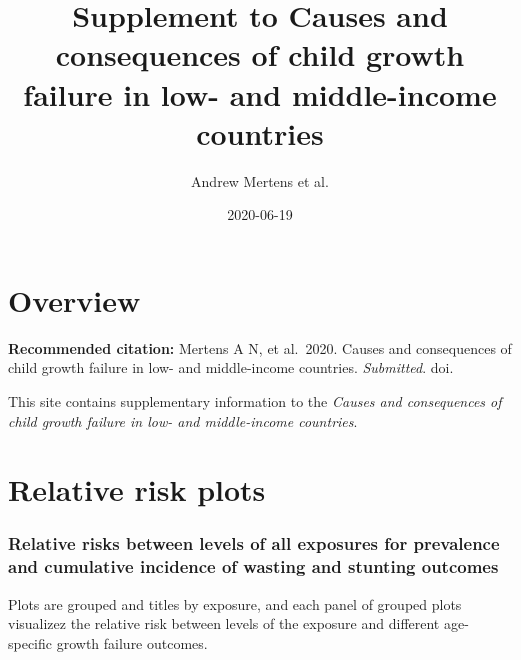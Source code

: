 \documentclass[
  9pt,
]{book}
\title{Supplement to Causes and consequences of child growth failure in low- and middle-income countries}
\author{Andrew Mertens et al.}
\date{2020-06-19}
\begin{document}
\maketitle

{
\setcounter{tocdepth}{1}
\tableofcontents
}
\hypertarget{overview}{%
\chapter{Overview}\label{overview}}

\textbf{Recommended citation:} Mertens A N, et al.~2020. Causes and consequences of child growth failure in low- and middle-income countries. \emph{Submitted}. doi.

This site contains supplementary information to the \emph{Causes and consequences of child growth failure in low- and middle-income countries}.

\hypertarget{RR}{%
\chapter{Relative risk plots}\label{RR}}

\raggedright

\hypertarget{relative-risks-between-levels-of-all-exposures-for-prevalence-and-cumulative-incidence-of-wasting-and-stunting-outcomes}{%
\subsection{Relative risks between levels of all exposures for prevalence and cumulative incidence of wasting and stunting outcomes}\label{relative-risks-between-levels-of-all-exposures-for-prevalence-and-cumulative-incidence-of-wasting-and-stunting-outcomes}}

Plots are grouped and titles by exposure, and each panel of grouped plots visualizez the relative risk between levels of the exposure and different age-specific growth failure outcomes.
\end{document}
